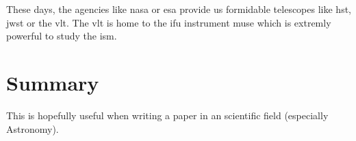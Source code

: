 These days, the agencies like \gls{nasa} or \gls{esa} provide us formidable telescopes like \gls{hst}, \gls{jwst} or the \gls{vlt}. The \gls{vlt} is home to the \gls{ifu} instrument \gls{muse} which is extremly powerful to study the \gls{ism}.





\chapter{Summary}\label{sec:summary}

This is hopefully useful when writing a paper in an scientific field (especially Astronomy). 


